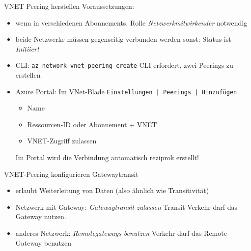 \begin{flashcard}[Definition]{VNET Peering herstellen}
    Voraussetzungen:
    \begin{itemize}
        \item wenn in verschiedenen Abonnements, Rolle \emph{Netzwerkmitwirkender} notwendig
        \item beide Netzwerke müssen gegenseitig verbunden werden\newline
            sonst: Status ist \emph{Initiiert}
    \end{itemize}

    \begin{itemize}
        \item CLI: \texttt{az network vnet peering create}\newline
            CLI erfordert, zwei Peerings zu erstellen
        \item Azure Portal: Im VNet-Blade \texttt{Einstellungen | Peerings | Hinzufügen}
        \begin{itemize}
            \item Name
            \item Ressourcen-ID oder Abonnement + VNET
            \item VNET-Zugriff zulassen
        \end{itemize}
        Im Portal wird die Verbindung automatisch reziprok erstellt!
    \end{itemize}

\end{flashcard}

\begin{flashcard}[Definition]{VNET-Peering konfigurieren}
    Gatewaytransit
    \begin{itemize}
        \item erlaubt Weiterleitung von Daten (also ähnlich wie Transitivität)
        \item Netzwerk mit Gateway: \emph{Gatewaytransit zulassen}\newline
            Transit-Verkehr darf das Gateway nutzen.
        \item anderes Netzwerk: \emph{Remotegateways benutzen}\newline
            Verkehr darf das Remote-Gateway benutzen
    \end{itemize}
\end{flashcard}

